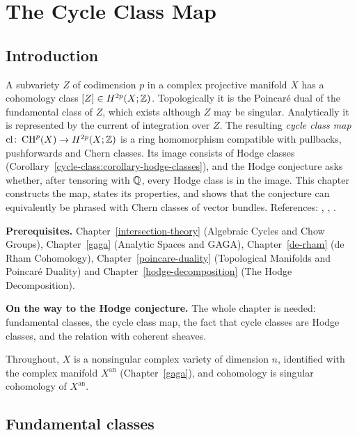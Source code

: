 \chapter{The Cycle Class Map}\label{cycle-class}

\section{Introduction}\label{cycle-class:section-introduction}

A subvariety $Z$ of codimension $p$ in a complex projective manifold $X$ has a cohomology class $[Z] \in H^{2p}(X; \mathbb{Z})$. Topologically it is the
Poincar\'e dual of the fundamental class of $Z$, which exists although $Z$ may be singular. Analytically it is represented by the current of integration
over $Z$. The resulting \emph{cycle class map} $\mathrm{cl} \colon \operatorname{CH}^p(X) \to H^{2p}(X; \mathbb{Z})$ is a ring homomorphism compatible with pullbacks, pushforwards
and Chern classes. Its image consists of Hodge classes (Corollary~\ref{cycle-class:corollary-hodge-classes}), and the Hodge conjecture asks whether, after tensoring
with $\mathbb{Q}$, every Hodge class is in the image. This chapter constructs the map, states its properties, and shows that the conjecture can equivalently be
phrased with Chern classes of vector bundles. References: \cite[Chapter 19]{fulton-intersection}, \cite[Chapter 11]{voisin-hodge-1}, \cite[Chapter 0, Section 4]{griffiths-harris}.

\noindent\textbf{Prerequisites.} Chapter~\ref{intersection-theory} (Algebraic Cycles and Chow Groups), Chapter~\ref{gaga} (Analytic Spaces and GAGA),
Chapter~\ref{de-rham} (de Rham Cohomology), Chapter~\ref{poincare-duality} (Topological Manifolds and Poincar\'e Duality) and Chapter~\ref{hodge-decomposition}
(The Hodge Decomposition).

\noindent\textbf{On the way to the Hodge conjecture.} The whole chapter is needed: fundamental classes, the cycle class map, the fact that cycle classes are Hodge classes, and the relation with
coherent sheaves.

Throughout, $X$ is a nonsingular complex variety of dimension $n$, identified with the complex manifold $X^{\mathrm{an}}$ (Chapter~\ref{gaga}), and cohomology is singular
cohomology of $X^{\mathrm{an}}$.

\section{Fundamental classes}\label{cycle-class:section-fundamental-classes}

